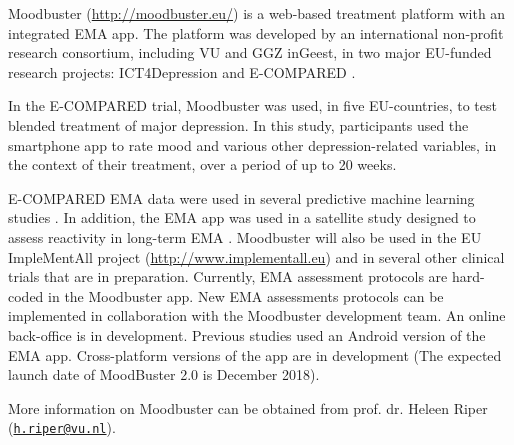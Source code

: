 \documentclass[]{book}
\begin{document}
Moodbuster (\url{http://moodbuster.eu/}) is a web-based treatment
platform with an integrated EMA app. The platform was developed by an
international non-profit research consortium, including VU and GGZ
inGeest, in two major EU-funded research projects: ICT4Depression
\citep[see ICT4Depression.eu;][]{warmerdam2012} and E-COMPARED
\citep[see \url{http://e-compared.eu};][]{Kleiboer2016, VandeVen2017}.

In the E-COMPARED trial, Moodbuster was used, in five EU-countries, to
test blended treatment of major depression. In this study, participants
used the smartphone app to rate mood and various other
depression-related variables, in the context of their treatment, over a
period of up to 20 weeks.

E-COMPARED EMA data were used in several predictive machine learning
studies \citep{mikus2018, rocha2018}. In addition, the EMA app was used
in a satellite study designed to assess reactivity in long-term EMA
\citep{VanBallegooijen2016}. Moodbuster will also be used in the EU
ImpleMentAll project (\url{http://www.implementall.eu}) and in several
other clinical trials that are in preparation. Currently, EMA assessment
protocols are hard-coded in the Moodbuster app. New EMA assessments
protocols can be implemented in collaboration with the Moodbuster
development team. An online back-office is in development. Previous
studies used an Android version of the EMA app. Cross-platform versions
of the app are in development (The expected launch date of MoodBuster
2.0 is December 2018).

More information on Moodbuster can be obtained from prof. dr. Heleen
Riper (\href{mailto:h.riper@vu.nl}{\nolinkurl{h.riper@vu.nl}}).
\end{document}
